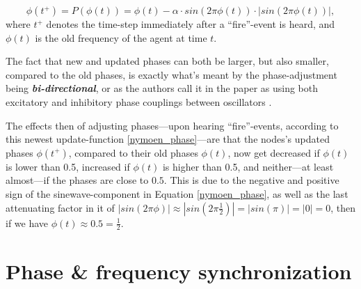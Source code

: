 	\begin{equation}
	\label{nymoen_phase}
		\phi(t^+)=P(\phi(t)) = \phi(t) - \alpha \cdot sin(2\pi\phi(t)) \cdot | sin(2\pi\phi(t)) | ,
	\end{equation} \nl
	where $t^+$ denotes the time-step immediately after a ``fire''-event is heard, and $\phi(t)$ is the old frequency of the agent at time $t$.

	The fact that new and updated phases can both be larger, but also smaller, compared to the old phases, is exactly what's meant by the phase-adjustment being \textbf{\textit{bi-directional}}, or as the authors call it in the paper as using both excitatory and inhibitory phase couplings between oscillators \cite{nymoen_synch}.

	The effects then of adjusting phases—upon hearing ``fire''-events, according to this newest update-function \eqref{nymoen_phase}—are that the nodes's updated phases $\phi(t^+)$, compared to their old phases $\phi(t)$, now get decreased if $\phi(t)$ is lower than 0.5, increased if $\phi(t)$ is higher than 0.5, and neither—at least almost—if the phases are close to $0.5$. This is due to the negative and positive sign of the sinewave-component in Equation \eqref{nymoen_phase}, as well as the last attenuating factor in it of $| sin(2\pi\phi) | \approx | sin(2\pi \frac{1}{2}) | = | sin(\pi) | = | 0 | = 0$, then if we have $\phi(t) \approx 0.5 = \frac{1}{2}$.




\section{Phase \& frequency synchronization}





